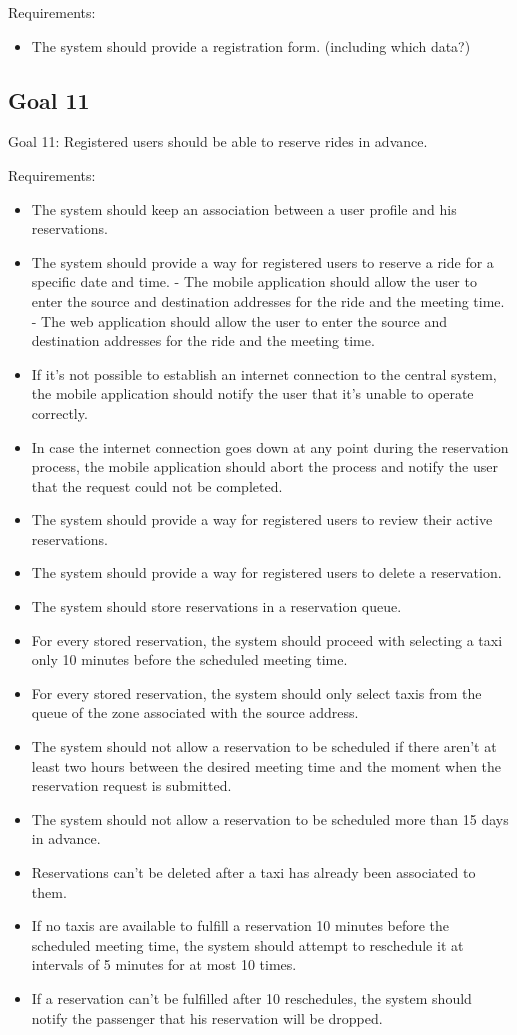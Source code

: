 \documentclass{book}
\begin{document}
Requirements:
\begin{itemize}
\item The system should provide a registration form. (including which data?)
\end{itemize}

\subsection{Goal 11}
Goal 11: Registered users should be able to reserve rides in advance.

Requirements:
\begin{itemize}
\item The system should keep an association between a user profile and his reservations.
\item The system should provide a way for registered users to reserve a ride for a specific date and time.
	- The mobile application should allow the user to enter the source and destination addresses for the ride and the meeting time.
	- The web application should allow the user to enter the source and destination addresses for the ride and the meeting time.
\item If it’s not possible to establish an internet connection to the central system, the mobile application should notify the user that it’s unable to operate correctly.
\item In case the internet connection goes down at any point during the reservation process, the mobile application should abort the process and notify the user that the request could not be completed.
\item The system should provide a way for registered users to review their active reservations.
\item The system should provide a way for registered users to delete a reservation.
\item The system should store reservations in a reservation queue. 
\item For every stored reservation, the system should proceed with selecting a taxi only 10 minutes before the scheduled meeting time.
\item For every stored reservation, the system should only select taxis from the queue of the zone associated with the source address.
\item The system should not allow a reservation to be scheduled if there aren’t at least two hours between the desired meeting time and the moment when the reservation request is submitted. 
\item The system should not allow a reservation to be scheduled more than 15 days in advance.
\item Reservations can’t be deleted after a taxi has already been associated to them.
\item If no taxis are available to fulfill a reservation 10 minutes before the scheduled meeting time, the system should attempt to reschedule it at intervals of 5 minutes for at most 10 times.
\item If a reservation can’t be fulfilled after 10 reschedules, the system should notify the passenger that his reservation will be dropped. 
\end{itemize}
\end{document}
